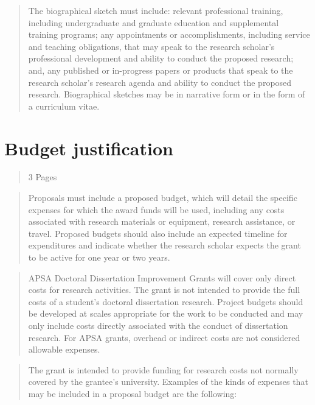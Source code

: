 \documentclass[
      12pt,
        ]{article}
\begin{document}
\begin{quote}
The biographical sketch must include: relevant professional training, including undergraduate and graduate education and supplemental training programs; any appointments or accomplishments, including service and teaching obligations, that may speak to the research scholar's professional development and ability to conduct the proposed research; and, any published or in-progress papers or products that speak to the research scholar's research agenda and ability to conduct the proposed research. Biographical sketches may be in narrative form or in the form of a curriculum vitae.
\end{quote}

\newpage

\hypertarget{budget-justification}{%
\section{Budget justification}\label{budget-justification}}

\begin{quote}
3 Pages
\end{quote}

\begin{quote}
Proposals must include a proposed budget, which will detail the specific expenses for which the award funds will be used, including any costs associated with research materials or equipment, research assistance, or travel. Proposed budgets should also include an expected timeline for expenditures and indicate whether the research scholar expects the grant to be active for one year or two years.
\end{quote}

\begin{quote}
APSA Doctoral Dissertation Improvement Grants will cover only direct costs for research activities. The grant is not intended to provide the full costs of a student's doctoral dissertation research. Project budgets should be developed at scales appropriate for the work to be conducted and may only include costs directly associated with the conduct of dissertation research. For APSA grants, overhead or indirect costs are not considered allowable expenses.
\end{quote}

\begin{quote}
The grant is intended to provide funding for research costs not normally covered by the grantee's university. Examples of the kinds of expenses that may be included in a proposal budget are the following:
\end{quote}
\end{document}
